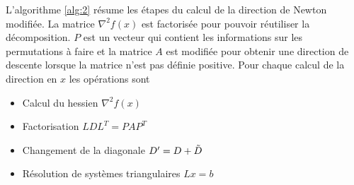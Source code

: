 \noindent
L'algorithme \ref{alg:2} r\'esume les \'etapes du calcul de la direction de Newton modifi\'ee.
La matrice $\nabla^2 f(x)$ est factoris\'ee pour pouvoir r\'eutiliser la d\'ecomposition. 
$P$ est un vecteur qui contient les informations sur les permutations \`a faire et la matrice $A$ est
modifi\'ee pour obtenir une direction de descente lorsque la matrice n'est pas d\'efinie positive.
Pour chaque calcul de la direction en $x$ les op\'erations sont 
\begin{itemize}
\item Calcul du hessien $\nabla^2 f(x)$
\item Factorisation $LDL^T=PAP^T$
\item Changement de la diagonale $D'=D+\Tilde{D}$
\item R\'esolution de syst\`emes triangulaires $Lx=b$ 
\end{itemize}

